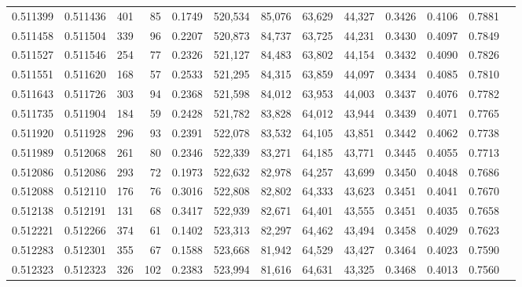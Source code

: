 \begin{tabular}{rrrrrrrrrrrrr}
0.511399 & 0.511436 &   401 &    85 &                                     0.1749 & 520,534 &  85,076 &  63,629 &  44,327 & 0.3426 & 0.4106 & 0.7881 \\
0.511458 & 0.511504 &   339 &    96 &                                     0.2207 & 520,873 &  84,737 &  63,725 &  44,231 & 0.3430 & 0.4097 & 0.7849 \\
0.511527 & 0.511546 &   254 &    77 &                                     0.2326 & 521,127 &  84,483 &  63,802 &  44,154 & 0.3432 & 0.4090 & 0.7826 \\
0.511551 & 0.511620 &   168 &    57 &                                     0.2533 & 521,295 &  84,315 &  63,859 &  44,097 & 0.3434 & 0.4085 & 0.7810 \\
0.511643 & 0.511726 &   303 &    94 &                                     0.2368 & 521,598 &  84,012 &  63,953 &  44,003 & 0.3437 & 0.4076 & 0.7782 \\
0.511735 & 0.511904 &   184 &    59 &                                     0.2428 & 521,782 &  83,828 &  64,012 &  43,944 & 0.3439 & 0.4071 & 0.7765 \\
0.511920 & 0.511928 &   296 &    93 &                                     0.2391 & 522,078 &  83,532 &  64,105 &  43,851 & 0.3442 & 0.4062 & 0.7738 \\
0.511989 & 0.512068 &   261 &    80 &                                     0.2346 & 522,339 &  83,271 &  64,185 &  43,771 & 0.3445 & 0.4055 & 0.7713 \\
0.512086 & 0.512086 &   293 &    72 &                                     0.1973 & 522,632 &  82,978 &  64,257 &  43,699 & 0.3450 & 0.4048 & 0.7686 \\
0.512088 & 0.512110 &   176 &    76 &                                     0.3016 & 522,808 &  82,802 &  64,333 &  43,623 & 0.3451 & 0.4041 & 0.7670 \\
0.512138 & 0.512191 &   131 &    68 &                                     0.3417 & 522,939 &  82,671 &  64,401 &  43,555 & 0.3451 & 0.4035 & 0.7658 \\
0.512221 & 0.512266 &   374 &    61 &                                     0.1402 & 523,313 &  82,297 &  64,462 &  43,494 & 0.3458 & 0.4029 & 0.7623 \\
0.512283 & 0.512301 &   355 &    67 &                                     0.1588 & 523,668 &  81,942 &  64,529 &  43,427 & 0.3464 & 0.4023 & 0.7590 \\
0.512323 & 0.512323 &   326 &   102 &                                     0.2383 & 523,994 &  81,616 &  64,631 &  43,325 & 0.3468 & 0.4013 & 0.7560 \\

\end{tabular}
